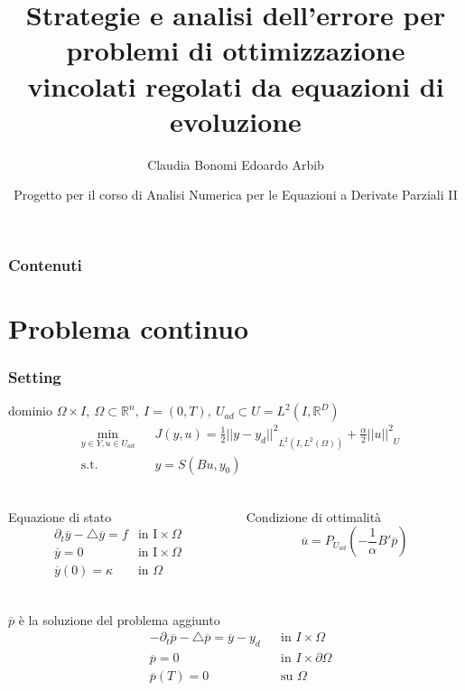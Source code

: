 \documentclass{beamer}
\title[Controllo ottimo parabolico]{Strategie e analisi dell'errore per problemi di ottimizzazione vincolati regolati da equazioni di evoluzione}
\author[Arbib \& Bonomi]{Claudia Bonomi  Edoardo Arbib}
\date[Progetto anedp]{Progetto per il corso di Analisi Numerica per le Equazioni a Derivate Parziali II}
\institute[Polimi]{POLITECNICO DI MILANO}
\theoremstyle{definition}
\theoremstyle{remark}
\theoremstyle{plain}
\theoremstyle{definition}
\newcommand{\numberset}{\mathbb}
\newcommand{\R}{\numberset{R}}
\begin{document}
\begin{frame}
\maketitle
\end{frame}

\begin{frame}
\frametitle{Contenuti}
\tableofcontents
\end{frame}


\section{Problema continuo}
\begin{frame}
\frametitle{Setting}
dominio $ \Omega\times I,\  \Omega \subset \mathbb{R}^n,\ I=(0,T),\ U_{ad}\subset U=L^2(I,\R^D) $ 
\begin{equation}
\begin{aligned}
& \underset{y \in Y, u \in U_{ad}}{\text{min}}
& & J(y,u) = \frac{1}{2}{||y-y_d||^{2}}_{L^2(I,{L^{2}(\Omega)})} + \frac{\alpha}{2}{||u||^{2}}_U \\
& \text{s.t.} & & y = S(Bu,y_0) \\
\end{aligned}
\end{equation}

\begin{columns}[t]
\begin{column}{0.4\textwidth}
Equazione di stato
\begin{equation*}
\begin{array}{cc}
 	{\partial_{t}}\overline{y} - {\bigtriangleup}\overline{y} = f & \text{in I}\times\Omega \\
	\overline{y}=0 & \text{in I}\times\Omega \\
	\overline{y}(0) = \kappa & \text{in }\Omega \\
\end{array}
\end{equation*}
\end{column}

\begin{column}{0.4\textwidth}
Condizione di ottimalità 
\begin{equation*}
\overline{u}=P_{U_{ad}}\left( -\frac{1}{\alpha}B'\overline{p} \right)
\end{equation*}
\end{column}
\end{columns}

$\overline{p} $ è la soluzione del problema aggiunto
\begin{equation}
\begin{aligned}
& -{\partial_{t}}\overline{p} -\bigtriangleup\overline{p} =\overline{y} - y_d & & \text{in }I{\times}\Omega \\
& \overline{p}=0 & & \text{in }I{\times}\partial\Omega \\
& \overline{p}(T)=0 & & \text{su }\Omega \\
\label{eq:217}
\end{aligned}
\end{equation}
\end{frame}
\end{document}
